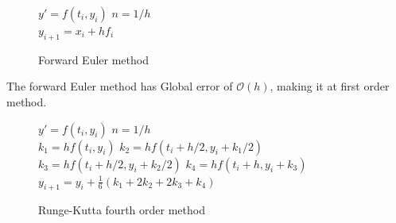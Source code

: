 \documentclass[english,notitlepage,reprint,nofootinbib]{revtex4-1}  %
\begin{document}
%
\begin{figure}[H]
    \begin{algorithm}[H]
    \caption{Forward Euler method}
    \label{algo:EUL}
        \begin{algorithmic}
            \State $y' = f(t_i,y_i)$        
            \State $n = 1 / h$ 
            \\
            \State $y_{i+1} = x_i + h f_i$   
            \EndFor
            \EndProcedure
        \end{algorithmic}
    \end{algorithm}
\end{figure}
The forward Euler method has Global error of $\mathcal{O}(h)$, 
making it at first order method.
\begin{figure}[H]
        \begin{algorithm}[H]
        \caption{Runge-Kutta fourth order method}
        \label{algo:RK4}
            \begin{algorithmic}
                \State $y' = f(t_i,y_i)$        
                \State $n = 1 / h$ 
                \\
                \State $k_1 = hf(t_i,y_i)$  
                \State $k_2 = hf(t_i + h/2, y_i +k_1/2)$  
                \State $k_3 = hf(t_i + h/2, y_i + k_2/2)$ 
                \State $k_4 = hf(t_i + h, y_i + k_3)$ 
                \State $y_{i+1} = y_i + \frac{1}{6}(k_1 + 2k_2 + 2k_3 + k_4)$ 
                \EndFor
                \EndProcedure
            \end{algorithmic}
        \end{algorithm}
    \end{figure}
\end{document}
